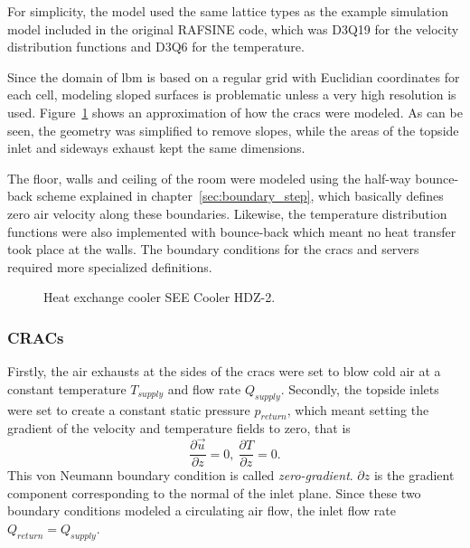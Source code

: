 For simplicity, the model used the same lattice types as the example simulation model included in the original RAFSINE code, which was D3Q19 for the velocity distribution functions and D3Q6 for the temperature.

Since the domain of \gls{lbm} is based on a regular grid with Euclidian coordinates for each cell, modeling sloped surfaces is problematic unless a very high resolution is used. Figure~\ref{fig:crac} shows an approximation of how the \gls{crac}s were modeled. As can be seen, the geometry was simplified to remove slopes, while the areas of the topside inlet and sideways exhaust kept the same dimensions.

The floor, walls and ceiling of the room were modeled using the half-way bounce-back scheme explained in chapter~\ref{sec:boundary_step}, which basically defines zero air velocity along these boundaries. Likewise, the temperature distribution functions were also implemented with bounce-back which meant no heat transfer took place at the walls. The boundary conditions for the \gls{crac}s and servers required more specialized definitions.

\begin{figure}[!htb]
\centering
\begin{scriptsize} %
\def\svgwidth{0.5\linewidth}

\end{scriptsize}
\caption{Heat exchange cooler SEE Cooler HDZ-2.}
\label{fig:crac}
\end{figure}
\clearpage
\subsubsection{CRACs}
Firstly, the air exhausts at the sides of the \gls{crac}s were set to blow cold air at a constant temperature $T_{supply}$ and flow rate $Q_{supply}$. Secondly, the topside inlets were set to create a constant static pressure $p_{return}$, which meant setting the gradient of the velocity and temperature fields to zero, that is~\cites[pg.164]{Delbosc}
\begin{equation}
\frac{\partial\vec{u}}{\partial z}=0,~\frac{\partial T}{\partial z}=0.
\end{equation}
This von Neumann boundary condition  is called \textit{zero-gradient}. $\partial z$ is the gradient component corresponding to the normal of the inlet plane. Since these two boundary conditions modeled a circulating air flow, the inlet flow rate $Q_{return} = Q_{supply}$.


